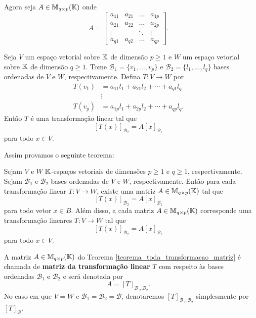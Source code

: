 Agora seja $A \in \mathbb{M}_{q\times p}(\mathbb{K})$ onde
\[
	A = \begin{bmatrix}
		a_{11} & a_{21} & \dots & a_{1p}\\
		a_{21} & a_{22} & \dots & a_{2p}\\
		\vdots & & \ddots & \vdots\\
		a_{q1} & a_{q2} & \dots & a_{qp}
	\end{bmatrix}.
\]

Seja $V$ um espa\c{c}o vetorial sobre $\mathbb{K}$ de dimens\~ao $p \ge 1$ e $W$ um espa\c{c}o vetorial sobre $\mathbb{K}$ de dimens\~ao $q \ge 1$. Tome $\mathcal{B}_1 = \{v_1,\dots,v_p\}$ e $\mathcal{B}_2 = \{l_1,\dots,l_q\}$ bases ordenadas de $V$ e $W$, respectivamente. Defina $T : V \to W$ por
\begin{align*}
	T(v_1) &= a_{11}l_1 + a_{21}l_2 + \cdots + a_{q1}l_q\\
	&\vdots\\
	T(v_p) &= a_{1p}l_1 + a_{2p}l_2 + \cdots + a_{qp}l_q.
\end{align*}
Ent\~ao $T$ \'e uma transforma\c{c}\~ao linear  tal que
\[
	[T(x)]_{\mathcal{B}_2} = A[x]_{\mathcal{B}_1}
\]
para todo $x \in V$.

Assim provamos o seguinte teorema:
\begin{teorema}\label{teorema_toda_transformacao_matriz}
	Sejam $V$ e $W$ $\mathbb{K}$-espa\c{c}os vetoriais de dimens\~oes $p \ge 1$ e $q \ge 1$, respectivamente. Sejam $\mathcal{B}_1$ e $\mathcal{B}_2$ bases ordenadas de $V$ e $W$, respectivamente. Ent\~ao para cada transforma\c{c}\~ao linear $T : V \to W$, existe uma matriz $A \in \mathbb{M}_{q\times p}(\mathbb{K})$ tal que
	\[
		[T(x)]_{\mathcal{B}_2} = A[x]_{\mathcal{B}_1}
	\]
	para todo vetor $x \in B$. Al\'em disso, a cada matriz $A \in \mathbb{M}_{q\times p}(\mathbb{K})$ corresponde uma transforma\c{c}\~ao lineares $T : V \to W$ tal que
	\[
		[T(x)]_{\mathcal{B}_2} = A[x]_{\mathcal{B}_1}
	\]
	para todo $x \in V$.
\end{teorema}

\begin{definicao}
	A matriz $A \in \mathbb{M}_{q\times p}(\mathbb{K})$ do Teorema \ref{teorema_toda_transformacao_matriz} \'e chamada de \textbf{matriz da transforma\c{c}\~ao linear} $T$ com respeito \`as bases ordenadas $\mathcal{B}_1$ e $\mathcal{B}_2$ e ser\'a denotada por
	\[
		A = [T]_{\mathcal{B}_{1},\mathcal{B}_{2}}.
	\]
	No caso em que $V = W$ e $\mathcal{B}_1 = \mathcal{B}_2 = \mathcal{B}$, denotaremos $[T]_{\mathcal{B}_{1},\mathcal{B}_{2}}$ simplesmente por $[T]_\mathcal{B}$.
\end{definicao}


